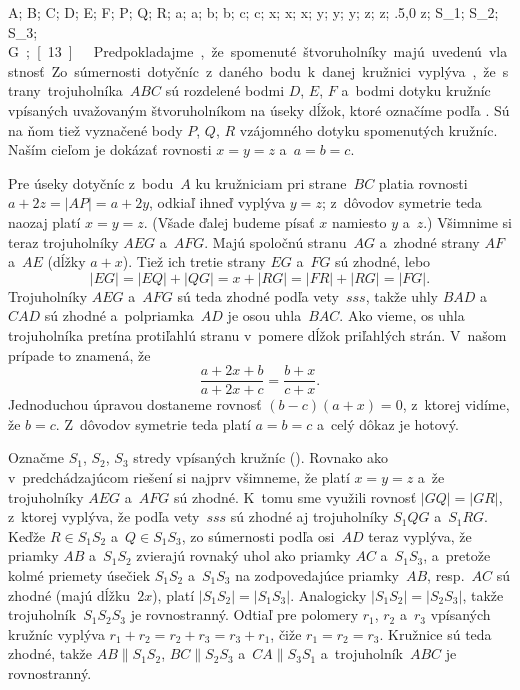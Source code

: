 {%
\fontplace
\tpoint A; \tpoint B; \bpoint C;
\lBpoint D; \rBpoint E; \tpoint F;
\bpoint P; \bpoint Q; \rpoint R;
\tpoint a; \rBpoint a; \tpoint b; \lBpoint b;
\lBpoint c; \rBpoint c;
\lBpoint x; \lBpoint x; \bpoint x;
\rBpoint y; \rBpoint y; \bpoint y;
\tpoint z; \tpoint z; \rpoint\xy.5,0 z;
\tpoint S_1; \tpoint S_2; \lpoint S_3;
\rpoint\down\unit G;
[13] \hfil\Obr

Predpokladajme, že spomenuté štvoruholníky majú uvedenú vlastnosť.
Zo súmernosti dotyčníc z~daného bodu k~danej kružnici
vyplýva, že strany trojuholníka~$ABC$ sú rozdelené bodmi $D$, $E$, $F$
a~bodmi dotyku kružníc vpísaných uvažovaným štvoruholníkom na úseky
dĺžok, ktoré označíme podľa \obr. Sú na ňom tiež vyznačené
body $P$, $Q$, $R$ vzájomného dotyku spomenutých kružníc. Naším
cieľom je dokázať rovnosti $x=y=z$ a~$a=b=c$.
\inspicture{}

Pre úseky dotyčníc z~bodu~$A$ ku kružniciam pri strane~$BC$
platia rovnosti $a+2z=|AP|=a+2y$, odkiaľ ihneď vyplýva $y=z$; z~dôvodov
symetrie teda naozaj platí $x=y=z$. (Všade ďalej budeme písať $x$
namiesto $y$ a~$z$.) Všimnime si
teraz trojuholníky $AEG$ a~$AFG$. Majú spoločnú stranu~$AG$ a~zhodné
strany $AF$ a~$AE$ (dĺžky $a+x$). Tiež ich tretie strany $EG$
a~$FG$ sú zhodné, lebo
$$
|EG|=|EQ|+|QG|=x+|RG|=|FR|+|RG|=|FG|.
$$
Trojuholníky $AEG$ a~$AFG$ sú teda zhodné podľa vety~$sss$, takže
uhly $BAD$ a~$CAD$ sú zhodné a~polpriamka~$AD$ je osou
uhla~$BAC$. Ako vieme, os uhla trojuholníka pretína protiľahlú
stranu v~pomere dĺžok priľahlých strán. V~našom prípade to
znamená, že
$$
\frac{a+2x+b}{a+2x+c}=\frac{b+x}{c+x}.
$$
Jednoduchou úpravou dostaneme rovnosť $(b-c)(a+x)=0$, z~ktorej
vidíme, že $b=c$. Z~dôvodov symetrie teda platí $a=b=c$
a~celý dôkaz je hotový.

\ineriesenie
Označme $S_1$, $S_2$, $S_3$ stredy vpísaných kružníc ().
Rovnako ako v~predchádzajúcom riešení si najprv všimneme, že platí
$x=y=z$ a~že trojuholníky $AEG$ a~$AFG$ sú zhodné. K~tomu
sme využili rovnosť $|GQ|=|GR|$, z~ktorej vyplýva, že podľa vety~$sss$
sú zhodné aj trojuholníky $S_1QG$ a~$S_1RG$. Keďže
$R\in S_1S_2$ a~$Q\in S_1S_3$, zo súmernosti podľa
osi~$AD$ teraz vyplýva, že priamky $AB$ a~$S_1S_2$ zvierajú rovnaký
uhol ako priamky $AC$ a~$S_1S_3$, a~pretože kolmé priemety úsečiek
$S_1S_2$ a~$S_1S_3$ na zodpovedajúce priamky~$AB$, resp.~$AC$ sú
zhodné (majú dĺžku~$2x$), platí $|S_1S_2|=|S_1S_3|$. Analogicky
$|S_1S_2|=|S_2S_3|$, takže trojuholník~$S_1S_2S_3$ je rovnostranný.
Odtiaľ pre polomery $r_1$, $r_2$ a~$r_3$ vpísaných kružníc vyplýva
$r_1+r_2=r_2+r_3=r_3+r_1$, čiže $r_1=r_2=r_3$. Kružnice sú
teda zhodné, takže $AB\parallel S_1S_2$, $BC\parallel S_2S_3$
a~$CA\parallel S_3S_1$ a~trojuholník~$ABC$ je rovnostranný.

}
